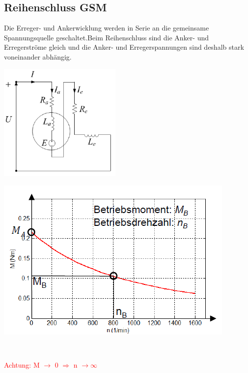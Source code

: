 \subsection{Reihenschluss GSM}
    Die Erreger- und Ankerwicklung werden in Serie an die gemeinsame Spannungsquelle geschaltet.\newline Beim Reihenschluss sind die Anker- und Erregerströme gleich und die Anker- und Erregerspannungen sind deshalb  stark voneinander abhängig.\newline
    \begin{minipage}[b]{0.4\textwidth}
    	\raggedright
    	\includegraphics[width=6cm]{images/Reihenschluss.png}
    \end{minipage}
    \begin{minipage}[b]{0.5\textwidth}
    	\raggedright
    	\includegraphics[scale = 0.8]{images/KennlinieReihenschluss1}
    \end{minipage}\\
    \begin{minipage}[b]{0.7\linewidth}
        \raggedleft
        \textcolor{red}{Achtung: M $\rightarrow$ 0 $\Rightarrow$ n $\rightarrow \infty$}
    \end{minipage}
